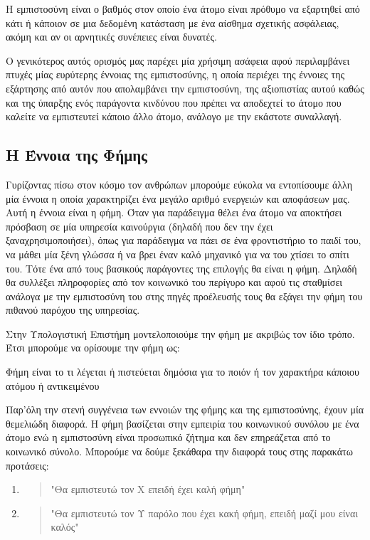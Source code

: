 \begin{decision}
Η εμπιστοσύνη είναι ο βαθμός στον οποίο ένα άτομο είναι πρόθυμο να εξαρτηθεί από κάτι ή κάποιον σε μια δεδομένη κατάσταση με ένα αίσθημα σχετικής ασφάλειας, ακόμη και αν οι αρνητικές συνέπειες είναι δυνατές.
\end{decision}

Ο γενικότερος αυτός ορισμός μας παρέχει μία χρήσιμη ασάφεια αφού περιλαμβάνει πτυχές μίας ευρύτερης έννοιας της εμπιστοσύνης, η οποία περιέχει της έννοιες της εξάρτησης από αυτόν που απολαμβάνει την εμπιστοσύνη, της αξιοπιστίας αυτού καθώς και της ύπαρξης ενός παράγοντα κινδύνου που πρέπει να αποδεχτεί το άτομο που καλείτε να εμπιστευτεί κάποιο άλλο άτομο, ανάλογο με την εκάστοτε συναλλαγή.

\subsection{Η Έννοια της Φήμης}\label{sec:rep}

Γυρίζοντας πίσω στον κόσμο τον ανθρώπων μπορούμε εύκολα να εντοπίσουμε άλλη μία έννοια η οποία χαρακτηρίζει ένα μεγάλο αριθμό ενεργειών και αποφάσεων μας. Αυτή η έννοια είναι η φήμη. Όταν για παράδειγμα θέλει ένα άτομο να αποκτήσει πρόσβαση σε μία υπηρεσία καινούργια (δηλαδή που δεν την έχει ξαναχρησιμοποιήσει), όπως για παράδειγμα να πάει σε ένα φροντιστήριο το παιδί του, να μάθει μία ξένη γλώσσα ή να βρει έναν καλό μηχανικό για να του χτίσει το σπίτι του. Τότε ένα από τους βασικούς παράγοντες της επιλογής θα είναι η φήμη. Δηλαδή θα συλλέξει πληροφορίες από τον κοινωνικό του περίγυρο και αφού τις σταθμίσει ανάλογα με την εμπιστοσύνη του στης πηγές προέλευσής τους θα εξάγει την φήμη του πιθανού παρόχου της υπηρεσίας.
\newpage

Στην Υπολογιστική Επιστήμη μοντελοποιούμε την φήμη με ακριβώς τον ίδιο τρόπο. Έτσι μπορούμε να ορίσουμε την φήμη ως:
\begin{reputation}
Φήμη είναι το τι λέγεται ή πιστεύεται δημόσια για το ποιόν ή τον χαρακτήρα κάποιου ατόμου ή αντικειμένου
\end{reputation}

Παρ'όλη την στενή συγγένεια των εννοιών της φήμης και της εμπιστοσύνης, έχουν μία θεμελιώδη διαφορά. Η φήμη βασίζεται στην εμπειρία του κοινωνικού συνόλου με ένα άτομο ενώ η εμπιστοσύνη είναι προσωπικό ζήτημα και δεν επηρεάζεται από το κοινωνικό σύνολο. Μπορούμε να δούμε ξεκάθαρα την διαφορά τους στης παρακάτω προτάσεις:
\begin{enumerate}
\item \begin{quote} 
"Θα εμπιστευτώ τον Χ επειδή έχει καλή φήμη"
\end{quote}
\item \begin{quote}
 "Θα εμπιστευτώ τον Υ παρόλο που έχει κακή φήμη, επειδή μαζί μου είναι καλός"
\end{quote}
\end{enumerate}

